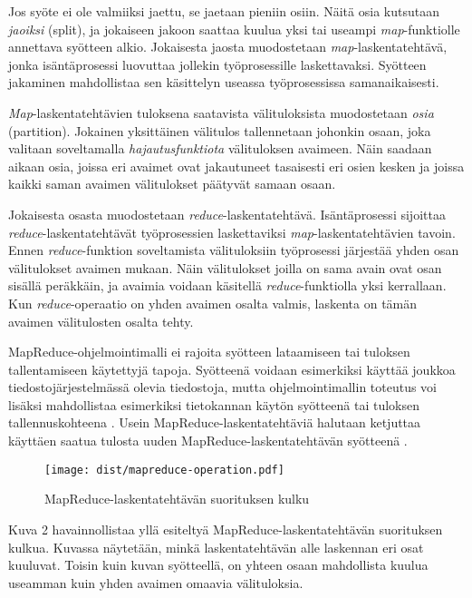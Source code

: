 \documentclass[finnish]{templates/tktltiki2}
\theoremstyle{definition}
\theoremstyle{remark}
\begin{document}
Jos syöte ei ole valmiiksi jaettu, se jaetaan pieniin osiin. Näitä osia
kutsutaan \emph{jaoiksi} (split), ja jokaiseen jakoon saattaa kuulua
yksi tai useampi \emph{map}-funktiolle annettava syötteen alkio.
Jokaisesta jaosta muodostetaan \emph{map}-laskentatehtävä, jonka
isäntäprosessi luovuttaa jollekin työprosessille laskettavaksi. Syötteen
jakaminen mahdollistaa sen käsittelyn useassa työprosessissa
samanaikaisesti.

\emph{Map}-laskentatehtävien tuloksena saatavista välituloksista
muodostetaan \emph{osia} (partition). Jokainen yksittäinen välitulos
tallennetaan johonkin osaan, joka valitaan soveltamalla
\emph{hajautusfunktiota} välituloksen avaimeen. Näin saadaan aikaan
osia, joissa eri avaimet ovat jakautuneet tasaisesti eri osien kesken ja
joissa kaikki saman avaimen välitulokset päätyvät samaan osaan.

Jokaisesta osasta muodostetaan \emph{reduce}-laskentatehtävä.
Isäntäprosessi sijoittaa \emph{reduce}-laskentatehtävät työprosessien
laskettaviksi \emph{map}-laskentatehtävien tavoin. Ennen
\emph{reduce}-funktion soveltamista välituloksiin työprosessi järjestää
yhden osan välitulokset avaimen mukaan. Näin välitulokset joilla on sama
avain ovat osan sisällä peräkkäin, ja avaimia voidaan käsitellä
\emph{reduce}-funktiolla yksi kerrallaan. Kun \emph{reduce}-operaatio on
yhden avaimen osalta valmis, laskenta on tämän avaimen välitulosten
osalta tehty.

MapReduce-ohjelmointimalli ei rajoita syötteen lataamiseen tai tuloksen
tallentamiseen käytettyjä tapoja. Syötteenä voidaan esimerkiksi käyttää
joukkoa tiedostojärjestelmässä olevia tiedostoja, mutta
ohjelmointimallin toteutus voi lisäksi mahdollistaa esimerkiksi
tietokannan käytön syötteenä tai tuloksen tallennuskohteena \cite[s.
74]{mapreduce2}. Usein MapReduce-laskentatehtäviä halutaan ketjuttaa
käyttäen saatua tulosta uuden MapReduce-laskentatehtävän syötteenä
\cite{mapreduce}.

\begin{figure}[htbp]
\centering
\texttt{[image: dist/mapreduce-operation.pdf]}
\caption{MapReduce-laskentatehtävän suorituksen kulku}
\end{figure}

Kuva 2 havainnollistaa yllä esiteltyä MapReduce-laskentatehtävän
suorituksen kulkua. Kuvassa näytetään, minkä laskentatehtävän alle
laskennan eri osat kuuluvat. Toisin kuin kuvan syötteellä, on yhteen
osaan mahdollista kuulua useamman kuin yhden avaimen omaavia
välituloksia.
\end{document}
